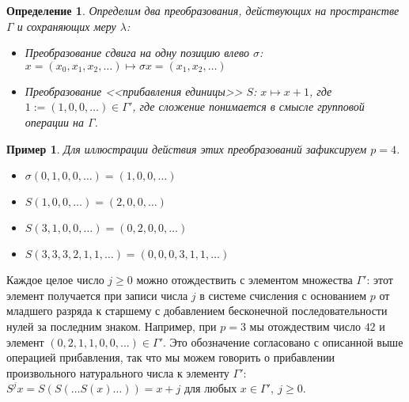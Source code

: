 \documentclass[14pt, a4paper, russian]{report}
\newtheorem{definition}{\indent Определение}
\newtheorem*{example}{\indent Пример}
\begin{document}
\begin{definition} Определим два преобразования, действующих на пространстве $\Gamma$ и сохраняющих меру $\lambda$:
\begin{itemize}
\item Преобразование сдвига на одну позицию влево $\sigma$: $x=\left(x_0, x_1, x_2, \ldots \right) \mapsto \sigma x = \left(x_1, x_2, \ldots \right)$
\item Преобразование <<прибавления единицы>> $S$: $x \mapsto x + 1$, где $1:=(1,0,0,\ldots) \in \Gamma'$, где сложение понимается в смысле групповой операции на $\Gamma$. 
\end{itemize}
\end{definition}
\begin{example}
Для иллюстрации действия этих преобразований зафиксируем $p=4$. 
\begin{itemize}
\item $\sigma (0,1,0,0,\ldots) = (1, 0, 0, \ldots)$
\item $S(1,0,0,\ldots) = (2,0,0,\ldots)$
\item $S(3,1,0,0,\ldots) = (0,2,0,0,\ldots)$
\item $S(3,3,3,2,1,1,\ldots)=(0,0,0,3,1,1,\ldots)$
\end{itemize}
\end{example}

Каждое целое число $j \ge 0$ можно отождествить с элементом множества $\Gamma'$: этот элемент получается при записи числа $j$ в системе счисления с основанием $p$ от младшего разряда к старшему с добавлением бесконечной последовательности нулей за последним знаком. Например, при $p=3$ мы отождествим число $42$ и элемент $(0,2,1,1,0,0,\ldots) \in \Gamma'$. Это обозначение согласовано с описанной выше операцией прибавления, так что мы можем говорить о прибавлении произвольного натурального числа к элементу $\Gamma'$: $S^j x = S(S(\ldots S(x)\ldots)) = x + j$ для любых $x \in \Gamma',\ j \ge 0$.
\end{document}
